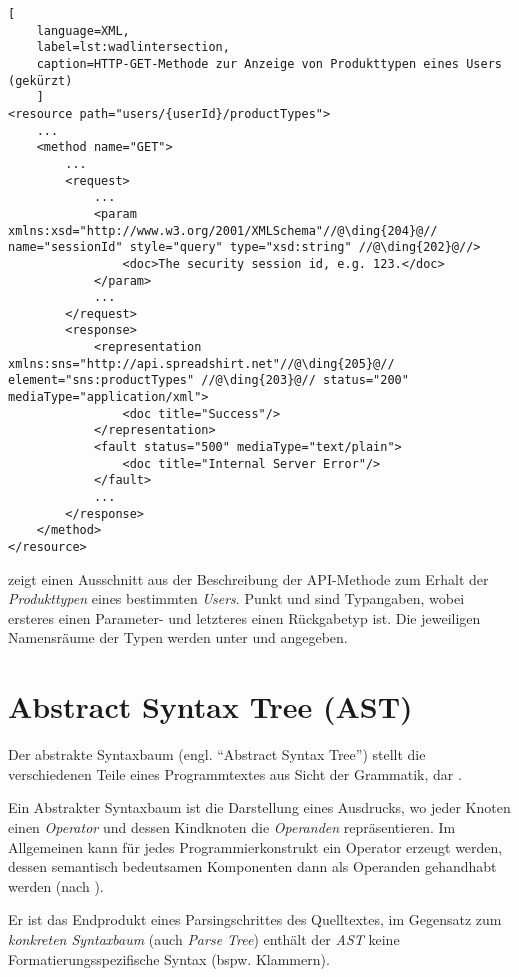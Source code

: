 \begin{lstlisting}[
    language=XML,
    label=lst:wadlintersection,
    caption=HTTP-GET-Methode zur Anzeige von Produkttypen eines Users (gekürzt)
    ]
<resource path="users/{userId}/productTypes">
    ...
    <method name="GET">
        ...
        <request>
            ...
            <param xmlns:xsd="http://www.w3.org/2001/XMLSchema"//@\ding{204}@// name="sessionId" style="query" type="xsd:string" //@\ding{202}@//>
                <doc>The security session id, e.g. 123.</doc>
            </param>
            ...
        </request>
        <response>
            <representation xmlns:sns="http://api.spreadshirt.net"//@\ding{205}@// element="sns:productTypes" //@\ding{203}@// status="200" mediaType="application/xml">
                <doc title="Success"/>
            </representation>
            <fault status="500" mediaType="text/plain">
                <doc title="Internal Server Error"/>
            </fault>
            ...
        </response>
    </method>
</resource>
\end{lstlisting}

 zeigt einen Ausschnitt aus der Beschreibung der API-Methode zum Erhalt der \emph{Produkttypen} eines bestimmten \emph{Users}. Punkt  und  sind Typangaben, wobei ersteres einen Parameter- und letzteres einen Rückgabetyp ist. Die jeweiligen Namensräume der Typen werden unter  und  angegeben.

\section{Abstract Syntax Tree (AST)}

\begin{thesisDefinition}
Der abstrakte Syntaxbaum (engl. \enquote{Abstract Syntax Tree}) stellt die verschiedenen Teile eines Programmtextes aus Sicht der Grammatik, dar \cite[][S. 9 ff.]{gruneCompiler}.
\end{thesisDefinition}
\begin{thesisDefinition}
Ein Abstrakter Syntaxbaum ist die Darstellung eines Ausdrucks, wo jeder Knoten einen \emph{Operator} und dessen Kindknoten die \emph{Operanden} repräsentieren.
Im Allgemeinen kann für jedes Programmierkonstrukt ein Operator erzeugt werden, dessen semantisch bedeutsamen Komponenten dann als Operanden gehandhabt werden (nach \cite[][S. 69]{ahoCompiler}).
\end{thesisDefinition}
Er ist das Endprodukt eines Parsingschrittes des Quelltextes, im Gegensatz zum \emph{konkreten Syntaxbaum} (auch \emph{Parse Tree}) enthält der \emph{AST} keine Formatierungsspezifische Syntax (bspw. Klammern). 

